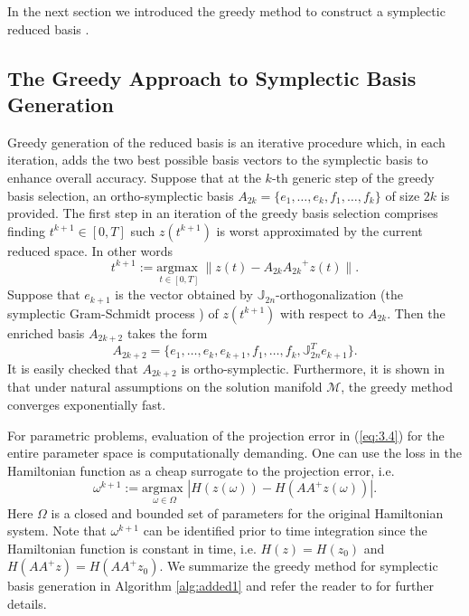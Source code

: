 In the next section we introduced the greedy method to construct a symplectic reduced basis \cite{Maboudi:2016}.

\subsection{The Greedy Approach to Symplectic Basis Generation} \label{sec:3.2}
Greedy generation of the reduced basis is an iterative procedure which, in each iteration, adds the two best possible basis vectors to the symplectic basis to enhance overall accuracy. Suppose that at the $k$-th generic step of the greedy basis selection, an ortho-symplectic basis $A_{2k} = \{ e_1,\dots,e_k,f_1,\dots,f_k\}$ of size $2k$ is provided. The first step in an iteration of the greedy basis selection comprises finding $t^{k+1}\in[0,T]$ such $z(t^{k+1})$ is worst approximated by the current reduced space. In other words
\begin{equation} \label{eq:3.4}
	t^{k+1} := \underset{t\in [0,T]}{\text{argmax }} \| z(t) - A_{2k}{A_{2k}}^+z(t) \|.
\end{equation}
Suppose that $e_{k+1}$ is the vector obtained by $\mathbb J_{2n}$-orthogonalization (the symplectic Gram-Schmidt process \cite{Salam2014}) of $z(t^{k+1})$ with respect to $A_{2k}$. Then the enriched basis $A_{2k+2}$ takes the form
\begin{equation}
	A_{2k+2} = \{ e_1,\dots,e_k, e_{k+1},f_1,\dots,f_k,\mathbb J_{2n}^T e_{k+1}\}.
\end{equation}
It is easily checked that $A_{2k+2}$ is ortho-symplectic. Furthermore, it is shown in \cite{Maboudi:2016} that under natural assumptions on the solution manifold $\mathcal M$, the greedy method converges exponentially fast.

For parametric problems, evaluation of the projection error in (\ref{eq:3.4}) for the entire parameter space is computationally demanding. One can use the loss in the Hamiltonian function as a cheap surrogate to the projection error, i.e.
\begin{equation}
	\omega^{k+1} := \underset{\omega\in \Omega}{\text{argmax }} | H(z(\omega)) - H(AA^+z(\omega)) |.
\end{equation}
Here $\Omega$ is a closed and bounded set of parameters for the original Hamiltonian system. Note that $\omega^{k+1}$ can be identified prior to time integration since the Hamiltonian function is constant in time, i.e. $H(z) = H(z_0)$ and $H(AA^+z) = H(AA^+z_0)$. We summarize the greedy method for symplectic basis generation in Algorithm \ref{alg:added1} and refer the reader to \cite{Maboudi:2016} for further details.




